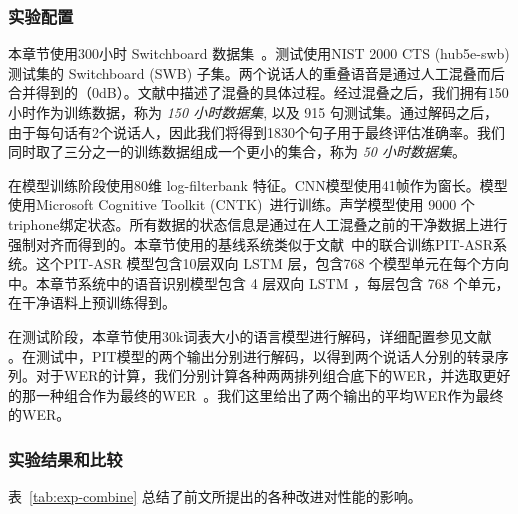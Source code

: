 \subsubsection{实验配置}
\label{Sec:exp-pit-setup}

本章节使用300小时 Switchboard 数据集~\cite{godfrey1992switchboard}。测试使用NIST
2000 CTS (hub5e-swb) 测试集的 Switchboard (SWB) 子集。两个说话人的重叠语音是通过人工混叠而后合并得到的（0dB）。文献\cite{chen2018progressive}中描述了混叠的具体过程。经过混叠之后，我们拥有150小时作为训练数据，称为 {\em{150 小时数据集}}, 以及 915 句测试集。通过解码之后，由于每句话有2个说话人，因此我们将得到1830个句子用于最终评估准确率。我们同时取了三分之一的训练数据组成一个更小的集合，称为 {\em{50 小时数据集}}。

在模型训练阶段使用80维 log-filterbank 特征。CNN模型使用41帧作为窗长。模型使用Microsoft Cognitive Toolkit (CNTK)~\cite{seide2016cntk}进行训练。声学模型使用 9000 个triphone绑定状态。所有数据的状态信息是通过在人工混叠之前的干净数据上进行强制对齐而得到的。本章节使用的基线系统类似于文献~\cite{yu2017recognizing}中的联合训练PIT-ASR系统。这个PIT-ASR 模型包含10层双向 LSTM 层，包含768 个模型单元在每个方向中。本章节系统中的语音识别模型包含 4 层双向 LSTM ，每层包含 768 个单元，在干净语料上预训练得到。

在测试阶段，本章节使用30k词表大小的语言模型进行解码，详细配置参见文献~\cite{chen2018progressive} 。在测试中，PIT模型的两个输出分别进行解码，以得到两个说话人分别的转录序列。对于WER的计算，我们分别计算各种两两排列组合底下的WER，并选取更好的那一种组合作为最终的WER~\cite{yu2017recognizing}。我们这里给出了两个输出的平均WER作为最终的WER。

\subsubsection{实验结果和比较}
\label{Sec:exp-pit-result}

表~\ref{tab:exp-combine} 总结了前文所提出的各种改进对性能的影响。

